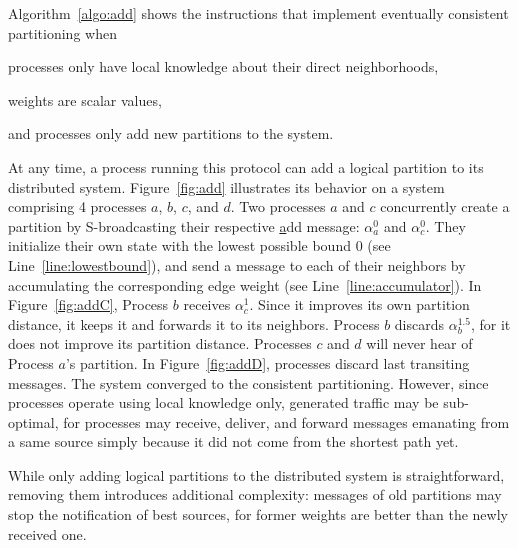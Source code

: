 Algorithm~\ref{algo:add} shows the instructions that implement
eventually consistent partitioning when
\begin{inparaenum}[(i)]
\item processes only have local knowledge about their direct
  neighborhoods,
\item weights are scalar values,
\item and processes only add new partitions to the system.
\end{inparaenum}
At any time, a process running this protocol can add a logical
partition to its distributed system.  Figure~\ref{fig:add} illustrates
its behavior on a system comprising 4 processes $a$, $b$, $c$, and
$d$. Two processes $a$ and $c$ concurrently create a partition by
S-broadcasting their respective \underline{a}dd message: $\alpha_a^0$
and $\alpha_c^0$. They initialize their own state with the lowest
possible bound $0$ (see Line~\ref{line:lowestbound}), and send a
message to each of their neighbors by accumulating the corresponding
edge weight (see Line~\ref{line:accumulator}). In
Figure~\ref{fig:addC}, Process $b$ receives $\alpha_{c}^{1}$. Since it
improves its own partition distance, it keeps it and forwards it to
its neighbors. Process $b$ discards $\alpha_{b}^{1.5}$, for it does
not improve its partition distance. Processes $c$ and $d$ will never
hear of Process $a$'s partition.  In Figure~\ref{fig:addD}, processes
discard last transiting messages. The system converged to the
consistent partitioning. However, since processes operate using local
knowledge only, generated traffic may be sub-optimal, for processes
may receive, deliver, and forward messages emanating from a same
source simply because it did not come from the shortest path yet.



While only adding logical partitions to the distributed system is
straightforward, removing them introduces additional complexity:
messages of old partitions may stop the notification of best sources,
for former weights are better than the newly received one. 

